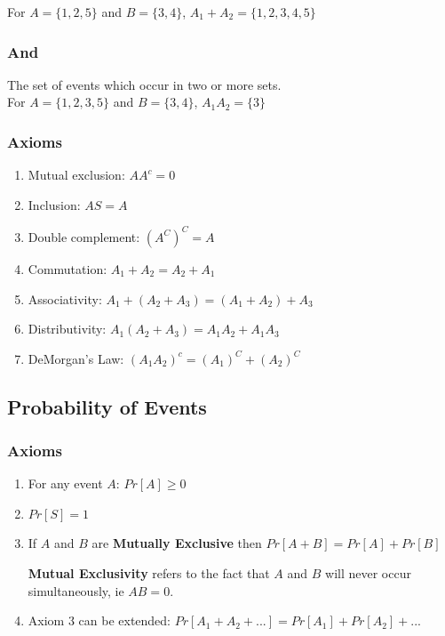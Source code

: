 \documentclass[11pt]{article}
\begin{document}
For $A = \{1,2,5\}$ and $B = \{3, 4\}$, $A_1 + A_2 = \{1, 2, 3, 4, 5\}$

\subsubsection{And}
The set of events which occur in two or more sets.\\

For $A = \{1,2,3, 5\}$ and $B = \{3, 4\}$, $A_1A_2 = \{3\}$

\subsubsection*{Axioms}
\begin{enumerate}
    \item{Mutual exclusion: } $AA^c = 0$
\item{Inclusion: } $AS = A$
\item{Double complement: }$(A^C)^C = A$
\item{Commutation: } $A_1 + A_2 = A_2 + A_1$
\item{Associativity: } $A_1 + (A_2 + A_3) = (A_1 + A_2) + A_3$ 
\item{Distributivity: } $A_1 (A_2 + A_3) = A_1A_2 + A_1A_3$
\item{DeMorgan’s Law: } $(A_1A_2)^c = (A_1)^C + (A_2)^C$
\end{enumerate}

\subsection{Probability of Events}

\subsubsection*{Axioms}
\begin{enumerate}
    \item{For any event $A$: $Pr[A] \geq 0$} 
    \item{$Pr[S] = 1$}
    \item{If $A$ and $B$ are \textbf{Mutually Exclusive} then } $Pr[A + B] = Pr[A] + Pr[B]$
    \begin{center}
        \textbf{Mutual Exclusivity} refers to the fact that $A$ and $B$ will never occur simultaneously, ie $AB = 0$.
    \end{center}
\item{Axiom 3 can be extended: } $Pr[A_1 + A_2 + ... ] = Pr[A_1] + Pr[A_2] + ...$
\end{enumerate}
\end{document}
